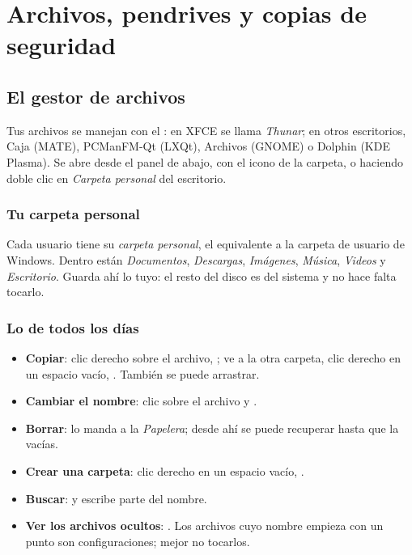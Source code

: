 \chapter{Archivos, pendrives y copias de seguridad}\label{cap:11-archivos}

\section{El gestor de archivos}

Tus archivos se manejan con el : en XFCE se
llama \emph{Thunar}; en otros escritorios, Caja (MATE), PCManFM-Qt
(LXQt), Archivos (GNOME) o Dolphin (KDE Plasma). Se abre desde el panel de
abajo, con el icono de la carpeta, o haciendo doble clic en \emph{Carpeta
personal} del escritorio.


\subsection{Tu carpeta personal}
Cada usuario tiene su \emph{carpeta personal}, el equivalente a la carpeta
de usuario de Windows. Dentro están \emph{Documentos}, \emph{Descargas},
\emph{Imágenes}, \emph{Música}, \emph{Videos} y \emph{Escritorio}. Guarda
ahí lo tuyo: el resto del disco es del sistema y no hace falta tocarlo.

\subsection{Lo de todos los días}
\begin{itemize}
  \item \textbf{Copiar}: clic derecho sobre el archivo, ; ve a
        la otra carpeta, clic derecho en un espacio vacío, .
        También se puede arrastrar.
  \item \textbf{Cambiar el nombre}: clic sobre el archivo y .
  \item \textbf{Borrar}:  lo manda a la \emph{Papelera}; desde
        ahí se puede recuperar hasta que la vacías.
  \item \textbf{Crear una carpeta}: clic derecho en un espacio vacío,
        .
  \item \textbf{Buscar}:  y escribe parte del nombre.
  \item \textbf{Ver los archivos ocultos}: . Los archivos
        cuyo nombre empieza con un punto son configuraciones; mejor no
        tocarlos.
\end{itemize}

